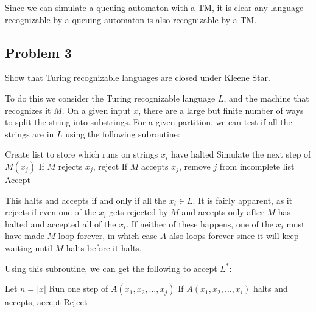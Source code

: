 \documentclass[english]{article}
\begin{document}
\begin{itemize}
  Since we can simulate a queuing automaton with a TM, it is clear any language recognizable
  by a queuing automaton is also recognizable by a TM.
\end{itemize}

\subsection*{Problem 3}
Show that Turing recognizable languages are closed under Kleene Star.

To do this we consider the Turing recognizable language $L$, and the machine
that recognizes it $M$.
On a given input $x$, there are a large but finite number of ways to split the
string into substrings. For a given partition, we can test if all the strings
are in $L$ using the following subroutine:
\begin{algorithmic}
\State Create list to store which runs on strings $x_i$ have halted
		\State Simulate the next step of $M(x_j)$
			\State If $M$ rejects $x_j$, reject
			\State If $M$ accepts $x_j$, remove $j$ from incomplete list
		\EndIf
	\EndFor
		\State Accept
	\EndIf
\EndFor
\EndFunction 
\end{algorithmic}

This halts and accepts if and only if all the $x_i \in L$. It is fairly apparent,
as it rejects if even one of the $x_i$ gets rejected by $M$ and accepts only after
$M$ has halted and accepted all of the $x_i$. If neither of these happens,
one of the $x_i$ must have made $M$ loop forever, in which case $A$ also loops
forever since it will keep waiting until $M$ halts before it halts.

Using this subroutine, we can get the following to accept $L^*$:
\begin{algorithmic}
\State Let $n = |x|$
			\State Run one step of $A(x_1,x_2,\ldots,x_j)$
			\State If $A(x_1,x_2,\ldots,x_i)$ halts and accepts, accept
		\EndFor
	\EndFor
\EndFor
\State Reject
\EndFunction 
\end{algorithmic}
\end{document}
